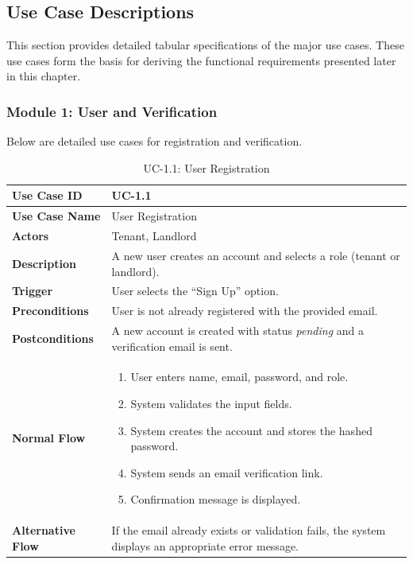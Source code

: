 \subsection{Use Case Descriptions}

This section provides detailed tabular specifications of the major use cases. These use cases form the basis for deriving the functional requirements presented later in this chapter.

\subsubsection{Module 1: User and Verification}

Below are detailed use cases for registration and verification.

\begin{table}[h]
\centering
\caption{UC-1.1: User Registration}

\begin{tabularx}{\textwidth}{
|>{\raggedright\arraybackslash}p{3.5cm}
|>{\raggedright\arraybackslash}X|}

\hline
\textbf{Use Case ID} & UC-1.1 \\ \hline
\textbf{Use Case Name} & User Registration \\ \hline
\textbf{Actors} & Tenant, Landlord \\ \hline
\textbf{Description} & A new user creates an account and selects a role (tenant or landlord). \\ \hline
\textbf{Trigger} & User selects the ``Sign Up'' option. \\ \hline
\textbf{Preconditions} & User is not already registered with the provided email. \\ \hline
\textbf{Postconditions} & A new account is created with status \textit{pending} and a verification email is sent. \\ \hline
\textbf{Normal Flow} &
\begin{enumerate}
    \item User enters name, email, password, and role.
    \item System validates the input fields.
    \item System creates the account and stores the hashed password.
    \item System sends an email verification link.
    \item Confirmation message is displayed.
\end{enumerate}
\\ \hline
\textbf{Alternative Flow} &
If the email already exists or validation fails, the system displays an appropriate error message.
\\ \hline

\end{tabularx}

\end{table}


